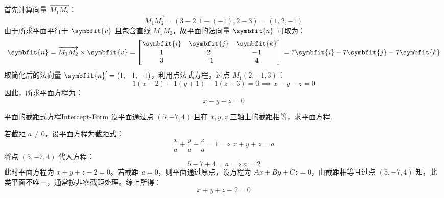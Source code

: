 \begin{solution}
    首先计算向量 $\overrightarrow{M_1 M_2}$：
    \begin{equation}
        \overrightarrow{M_1 M_2} = (3-2, 1-(-1), 2-3) = (1, 2, -1)
    \end{equation}
    由于所求平面平行于 $\symbfit{v}$ 且包含直线 $M_1 M_2$，故平面的法向量 $\symbfit{n}$ 可取为：
    \begin{equation}
        \symbfit{n} = \overrightarrow{M_1 M_2} \times \symbfit{v} = \begin{bmatrix} \symbfit{i} & \symbfit{j} & \symbfit{k} \\ 1 & 2 & -1 \\ 3 & -1 & 4 \end{bmatrix} = 7\symbfit{i} - 7\symbfit{j} - 7\symbfit{k}
    \end{equation}
    取简化后的法向量 $\symbfit{n}' = (1, -1, -1)$，利用点法式方程，过点 $M_1(2, -1, 3)$：
    \begin{equation}
        1(x - 2) - 1(y + 1) - 1(z - 3) = 0 \implies x - y - z = 0
    \end{equation}
    因此，所求平面方程为：
    \begin{equation}
        \boxed{x - y - z = 0}
    \end{equation}
\end{solution}

\begin{problem}{平面的截距式方程}{Intercept-Form}
    设平面通过点 $(5, -7, 4)$ 且在 $x, y, z$ 三轴上的截距相等，求平面方程.
\end{problem}

\begin{solution}
    若截距 $a \neq 0$，设平面方程为截距式：
    \begin{equation}
        \frac{x}{a} + \frac{y}{a} + \frac{z}{a} = 1 \implies x + y + z = a
    \end{equation}
    将点 $(5, -7, 4)$ 代入方程：
    \begin{equation}
        5 - 7 + 4 = a \implies a = 2
    \end{equation}
    此时平面方程为 $x + y + z - 2 = 0$。若截距 $a = 0$，则平面通过原点，设方程为 $Ax + By + Cz = 0$，由截距相等且过点 $(5, -7, 4)$ 知，此类平面不唯一，通常按非零截距处理。综上所得：
    \begin{equation}
        \boxed{x + y + z - 2 = 0}
    \end{equation}
\end{solution}

